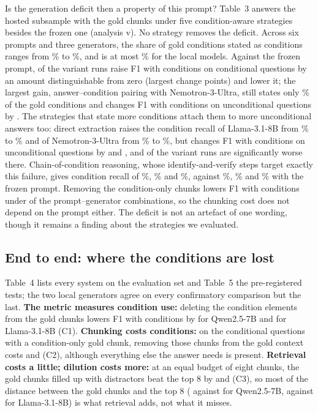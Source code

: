 Is the generation deficit then a property of this prompt? Table~3 answers the hosted subsample with the gold chunks under five condition-aware strategies besides the frozen one (analysis v). No strategy removes the deficit. Across six prompts and three generators, the share of gold conditions stated as conditions ranges from \prMinRecall\% to \prMaxRecall\%, and is at most \prMaxRecallLocal\% for the local models. Against the frozen prompt, \prNSigGain{} of the \prNRuns{} variant runs raise F1 with conditions on conditional questions by an amount distinguishable from zero (largest change \prMaxGain{} points) and \prNSigLoss{} lower it; the largest gain, answer--condition pairing with Nemotron-3-Ultra, still states only \prRecallNemoPairing\% of the gold conditions and changes F1 with conditions on unconditional questions by \prVsUncondNemoPairing. The strategies that state more conditions attach them to more unconditional answers too: direct extraction raises the condition recall of Llama-3.1-8B from \prRecallLlamaVFour\% to \prRecallLlamaExtract\% and of Nemotron-3-Ultra from \prRecallNemoVFour\% to \prRecallNemoExtract\%, but changes F1 with conditions on unconditional questions by \prVsUncondLlamaExtract{} and \prVsUncondNemoExtract, and \prNSigLossUncond{} of the \prNRuns{} variant runs are significantly worse there. Chain-of-condition reasoning, whose identify-and-verify steps target exactly this failure, gives condition recall of \prRecallQwenCoc\%, \prRecallLlamaCoc\% and \prRecallNemoCoc\%, against \prRecallQwenVFour\%, \prRecallLlamaVFour\% and \prRecallNemoVFour\% with the frozen prompt. Removing the condition-only chunks lowers F1 with conditions under \prCTwoPos{} of the \prCTwoN{} prompt--generator combinations, so the chunking cost does not depend on the prompt either. The deficit is not an artefact of one wording, though it remains a finding about the strategies we evaluated.



\subsection{End to end: where the conditions are lost}
\label{sec:endtoend}

Table~4 lists every system on the evaluation set and Table~5 the pre-registered tests; the two local generators agree on every confirmatory comparison but the last. \textbf{The metric measures condition use:} deleting the condition elements from the gold chunks lowers F1 with conditions by \cOneQwenPt{} for Qwen2.5-7B and \cOneLlamaPt{} for Llama-3.1-8B (C1). \textbf{Chunking costs conditions:} on the \nCondOnlyEval{} conditional questions with a condition-only gold chunk, removing those chunks from the gold context costs \cTwoQwenPt{} and \cTwoLlamaPt{} (C2), although everything else the answer needs is present. \textbf{Retrieval costs a little; dilution costs more:} at an equal budget of eight chunks, the gold chunks filled up with distractors beat the top 8 by \cThreeQwenPt{} and \cThreeLlamaPt{} (C3), so most of the distance between the gold chunks and the top 8 (\fcGoldQwen{} against \fcTopQwen{} for Qwen2.5-7B, \fcGoldLlama{} against \fcTopLlama{} for Llama-3.1-8B) is what retrieval adds, not what it misses.

